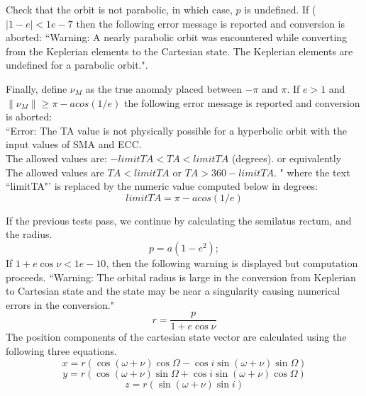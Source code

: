 Check that the orbit is not parabolic, in which case, $p$ is undefined.  If ($|1-e|< 1e-7$ then the following error message is reported and conversion is aborted:
``Warning: A nearly parabolic orbit was encountered while converting from the Keplerian elements to the Cartesian state.  The Keplerian elements are undefined for a parabolic orbit.".

Finally, define $\nu_M$ as the true anomaly placed between $-\pi$ and $\pi$.  If $e > 1$  and  $\|\nu_M\| \geq \pi - acos(1/e)$ the following error message is reported and conversion is aborted:\\
``Error: The TA value is not physically possible for a hyperbolic orbit with  the input values of SMA and ECC.\\
 The allowed values are: $-limitTA < TA < limitTA$ (degrees).
 or equivalently\\
 The allowed values are $TA < limitTA$ or $TA > 360 - limitTA$.
" where the text ``limitTA"' is replaced by the numeric value computed below in degrees:
%
\begin{equation}
    limitTA = \pi - acos(1/e)
\end{equation}
%

If the previous tests pass, we continue  by
calculating the semilatus rectum, and the radius.
%
\begin{equation}
    p = a(1-e^2);
\end{equation}
%
If $1+e\cos{\nu} < 1e-10$, then the following warning is displayed but computation proceeds. ``Warning: The orbital radius is large in  the conversion from Keplerian to Cartesian state and the state may be near a singularity causing numerical errors in the conversion."
%
\begin{equation}
     r = \frac{p}{1+e\cos{\nu}}
\end{equation}
%
The position components of the cartesian state vector are
calculated using the following three equations.
%
\begin{equation}
     x = r\left(\cos{(\omega + \nu)}\cos{\Omega} - \cos{i}\sin{(\omega + \nu)}\sin{\Omega}\right)
\end{equation}
\begin{equation}
     y = r\left(\cos{(\omega + \nu)}\sin{\Omega} + \cos{i}\sin{(\omega + \nu)}\cos{\Omega}\right)
\end{equation}
\begin{equation}
     z = r\left(\sin{(\omega + \nu)}\sin{i}\right)
\end{equation}
%

